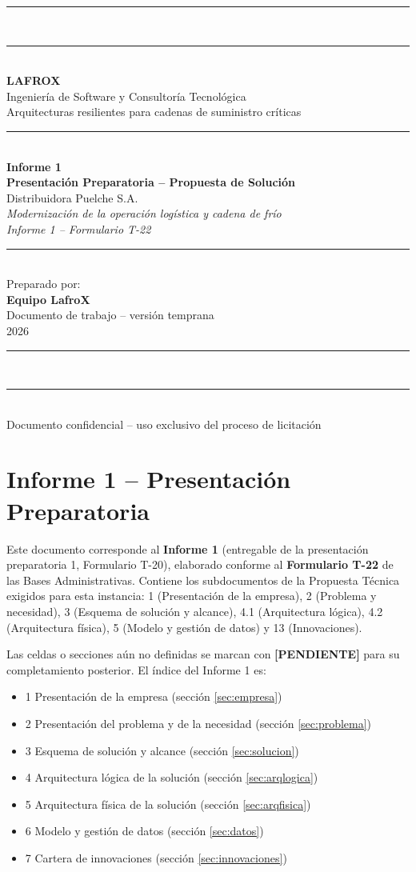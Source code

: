 \documentclass[11pt,a4paper,oneside]{report}
\newcommand{\pendiente}{{\color{lafroxAcento}\textbf{[PENDIENTE]}}}
\newcommand{\portada}{%
\begin{titlepage}
  \thispagestyle{empty}
  \noindent
  \begin{minipage}[t][\textheight][t]{\textwidth}
    \centering
    \vspace*{1.2cm}
    {\color{lafroxVioleta}\rule{\textwidth}{2pt}}\\[0.4cm]
    {\color{lafroxVioleta}\rule{\textwidth}{0.6pt}}\\[1.2cm]

    {\Huge\bfseries\color{lafroxVioleta} LAFROX}\\[0.5cm]
    {\Large\color{lafroxAzul} Ingeniería de Software y Consultoría Tecnológica}\\[0.2cm]
    {\large\color{lafroxGrato} Arquitecturas resilientes para cadenas de suministro críticas}\\[1.0cm]

    {\color{lafroxVioleta}\rule{0.5\textwidth}{1pt}}\\[1.0cm]

    {\Huge\bfseries\color{lafroxAzul} Informe 1}\\[0.6cm]
    {\Large\bfseries Presentación Preparatoria -- Propuesta de Solución}\\[0.4cm]
    {\large Distribuidora Puelche S.A.}\\[1.0cm]

    {\large\itshape\color{lafroxGrato}
      Modernización de la operación logística y cadena de frío\\[0.3cm]
      Informe 1 -- Formulario T-22}\\[1.6cm]

    {\color{lafroxVioleta}\rule{0.5\textwidth}{1pt}}\\[1.0cm]

    {\large\color{lafroxGrato} Preparado por:}\\[0.3cm]
    {\Large\bfseries\color{lafroxVioleta} Equipo LafroX}\\[1.0cm]

    {\large\color{lafroxGrato} Documento de trabajo -- versión temprana}\\[0.3cm]
    {\large\color{lafroxGrato} 2026}\\[0.4cm]

    \vfill
    {\color{lafroxVioleta}\rule{\textwidth}{0.6pt}}\\[0.3cm]
    {\color{lafroxVioleta}\rule{\textwidth}{2pt}}\\[0.2cm]
    \centering
    {\small\color{lafroxGrato} Documento confidencial -- uso exclusivo del proceso de licitación}
  \end{minipage}
\end{titlepage}
}
\begin{document}
\portada

\tableofcontents
\thispagestyle{empty}
\clearpage

\setcounter{page}{1}

\chapter*{Informe 1 -- Presentación Preparatoria}
Este documento corresponde al \textbf{Informe 1} (entregable de la presentación
preparatoria 1, Formulario T-20), elaborado conforme al \textbf{Formulario T-22} de las
Bases Administrativas. Contiene los subdocumentos de la Propuesta Técnica exigidos para
esta instancia: 1 (Presentación de la empresa), 2 (Problema y necesidad), 3 (Esquema de
solución y alcance), 4.1 (Arquitectura lógica), 4.2 (Arquitectura física), 5 (Modelo y
gestión de datos) y 13 (Innovaciones).

Las celdas o secciones aún no definidas se marcan con \pendiente{} para su completamiento
posterior. El índice del Informe 1 es:

\begin{itemize}
  \item 1 Presentación de la empresa (sección \ref{sec:empresa})
  \item 2 Presentación del problema y de la necesidad (sección \ref{sec:problema})
  \item 3 Esquema de solución y alcance (sección \ref{sec:solucion})
  \item 4 Arquitectura lógica de la solución (sección \ref{sec:arqlogica})
  \item 5 Arquitectura física de la solución (sección \ref{sec:arqfisica})
  \item 6 Modelo y gestión de datos (sección \ref{sec:datos})
  \item 7 Cartera de innovaciones (sección \ref{sec:innovaciones})
\end{itemize}








\end{document}
